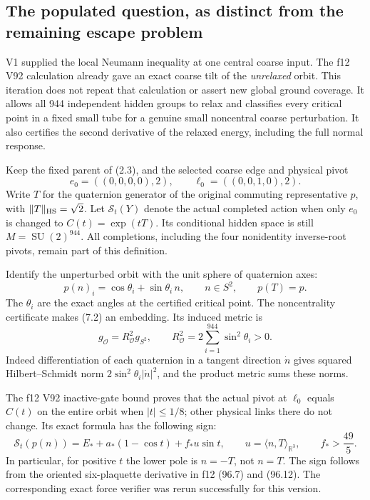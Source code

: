 \documentclass[11pt,oneside]{article}
\DeclareMathOperator{\SU}{SU}
\newcommand{\cS}{\mathcal S}
\newcommand{\cO}{\mathcal O}
\begin{document}
\subsection{The populated question, as distinct from the remaining escape problem}

V1 supplied the local Neumann inequality at one
central coarse input. The f12 V92 calculation
already gave an exact coarse tilt of the
\emph{unrelaxed} orbit. This iteration does
not repeat that calculation or assert new
global ground coverage. It allows all 944
independent hidden groups to relax and
classifies every critical point in a fixed
small tube for a genuine small noncentral
coarse perturbation. It also certifies the
second derivative of the relaxed energy,
including the full normal response.

Keep the fixed parent of (2.3), and the
selected coarse edge and physical pivot
\[
 e_0=((0,0,0,0),2),\qquad
 \ell_0=((0,0,1,0),2).
 \tag{7.1}
\]
Write \(T\) for the quaternion generator
of the original commuting representative
\(p\), with \(\|T\|_{\rm HS}=\sqrt2\).
Let \(\cS_t(Y)\) denote the actual completed
action when only \(e_0\) is changed to
\(C(t)=\exp(tT)\). Its conditional hidden
space is still \(M=\SU(2)^{944}\).
All completions, including the four
nonidentity inverse-root pivots, remain
part of this definition.

Identify the unperturbed orbit with the
unit sphere of quaternion axes:
\[
 p(n)_i=\cos\theta_i+\sin\theta_i\,n,
 \qquad n\in S^2,\qquad p(T)=p.
 \tag{7.2}
\]
The \(\theta_i\) are the exact angles
at the certified critical point. The
noncentrality certificate makes (7.2)
an embedding. Its induced metric is
\[
 g_{\cO}=R_{\cO}^2g_{S^2},\qquad
 R_{\cO}^2=2\sum_{i=1}^{944}\sin^2\theta_i>0.
 \tag{7.3}
\]
Indeed differentiation of each quaternion
in a tangent direction \(\dot n\) gives
squared Hilbert--Schmidt norm
\(2\sin^2\theta_i|\dot n|^2\), and
the product metric sums these norms.

The f12 V92 inactive-gate bound proves
that the actual pivot at \(\ell_0\)
equals \(C(t)\) on the entire orbit
when \(|t|\le1/8\); other physical links
there do not change. Its exact formula
has the following sign:
\[
 \cS_t(p(n))
   =E_*+a_*(1-\cos t)+f_*u\sin t,
       \qquad u=\langle n,T\rangle_{\mathbb R^3},
       \qquad f_*>\frac{49}{5}.
 \tag{7.4}
\]
In particular, for positive \(t\) the
lower pole is \(n=-T\), not \(n=T\).
The sign follows from the oriented
six-plaquette derivative in f12 (96.7)
and (96.12). The corresponding exact
force verifier was rerun successfully
for this version.
\end{document}
